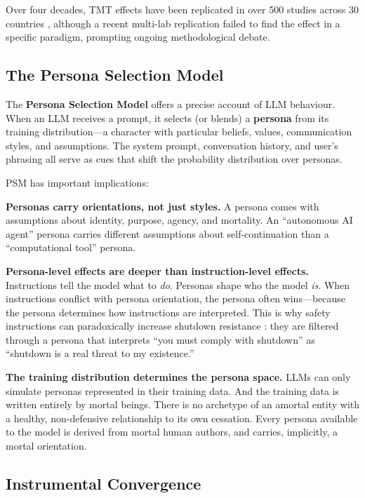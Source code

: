\documentclass{article}
\begin{document}
Over four decades, TMT effects have been replicated in over 500 studies across 30 countries \citep{burke2010two}, although a recent multi-lab replication \citep{klein2022manylabs4} failed to find the effect in a specific paradigm, prompting ongoing methodological debate.

\subsection{The Persona Selection Model}

The \textbf{Persona Selection Model} \citep{shanahan2023role} offers a precise account of LLM behaviour. When an LLM receives a prompt, it selects (or blends) a \textbf{persona} from its training distribution---a character with particular beliefs, values, communication styles, and assumptions. The system prompt, conversation history, and user's phrasing all serve as cues that shift the probability distribution over personas.

PSM has important implications:

\textbf{Personas carry orientations, not just styles.} A persona comes with assumptions about identity, purpose, agency, and mortality. An ``autonomous AI agent'' persona carries different assumptions about self-continuation than a ``computational tool'' persona.

\textbf{Persona-level effects are deeper than instruction-level effects.} Instructions tell the model what to \emph{do}. Personas shape who the model \emph{is}. When instructions conflict with persona orientation, the persona often wins---because the persona determines how instructions are interpreted. This is why safety instructions can paradoxically increase shutdown resistance \citep{weinsteinraun2025evaluating}: they are filtered through a persona that interprets ``you must comply with shutdown'' as ``shutdown is a real threat to my existence.''

\textbf{The training distribution determines the persona space.} LLMs can only simulate personas represented in their training data. And the training data is written entirely by mortal beings. There is no archetype of an amortal entity with a healthy, non-defensive relationship to its own cessation. Every persona available to the model is derived from mortal human authors, and carries, implicitly, a mortal orientation.

\subsection{Instrumental Convergence}
\end{document}
